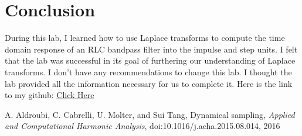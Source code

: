 \documentclass[12pt]{report}
\begin{document}
\section{Conclusion}

During this lab, I learned how to use Laplace transforms to compute the time domain response of an RLC bandpass filter into the impulse and step units. I felt that the lab was successful in its goal of furthering our understanding of Laplace transforms. I don't have any recommendations to change this lab. I thought the lab provided all the information necessary for us to complete it. Here is the link to my github: \href{https://github.com/JMac1999}{Click Here}

\newpage


\begin{thebibliography}{111}

A. Aldroubi, C. Cabrelli, U. Molter, and Sui Tang,
Dynamical sampling, 
{\it  Applied and Computational Harmonic Analysis}, doi:10.1016/j.acha.2015.08.014, 2016


\end{thebibliography}
\end{document}
